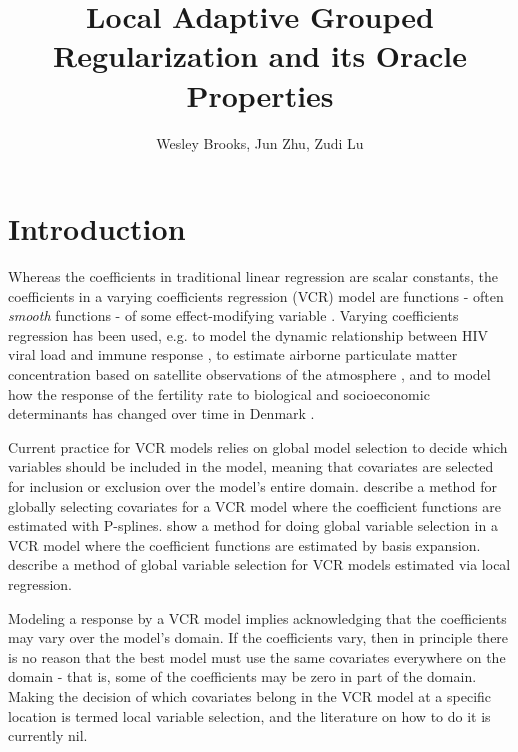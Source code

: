 \documentclass[12pt,english,authoryear, review]{article}\usepackage[]{graphicx}\usepackage[]{color}
\theoremstyle{plain}
\theoremstyle{plain}
\begin{document}
\title{Local Adaptive Grouped Regularization and its Oracle Properties}


\author{Wesley Brooks, Jun Zhu, Zudi Lu}

\maketitle

\section{Introduction}

Whereas the coefficients in traditional linear regression are scalar
constants, the coefficients in a varying coefficients regression (VCR)
model are functions - often \emph{smooth} functions - of some effect-modifying
variable \citep{Cleveland-Grosse-1991,Hastie-Tibshirani-1993}. Varying
coefficients regression has been used, e.g. to model the dynamic relationship
between HIV viral load and immune response \citep{Liang-Wu-Carroll-2003},
to estimate airborne particulate matter concentration based on satellite
observations of the atmosphere \citep{Pelletier-Santer-Vidot-2007},
and to model how the response of the fertility rate to biological
and socioeconomic determinants has changed over time in Denmark \citep{Kohler-Rodgers-Christensen-2003}.

Current practice for VCR models relies on global model selection to
decide which variables should be included in the model, meaning that
covariates are selected for inclusion or exclusion over the model's
entire domain. \citet{Antoniadis:2012a} describe a method for globally
selecting covariates for a VCR model where the coefficient functions
are estimated with P-splines. \citet{Wang-2008a} show a method for
doing global variable selection in a VCR model where the coefficient
functions are estimated by basis expansion. \citet{Wang-Xia-2009}
describe a method of global variable selection for VCR models estimated
via local regression.

Modeling a response by a VCR model implies acknowledging that the
coefficients may vary over the model's domain. If the coefficients
vary, then in principle there is no reason that the best model must
use the same covariates everywhere on the domain - that is, some of
the coefficients may be zero in part of the domain. Making the decision
of which covariates belong in the VCR model at a specific location
is termed local variable selection, and the literature on how to do
it is currently nil.
\end{document}
